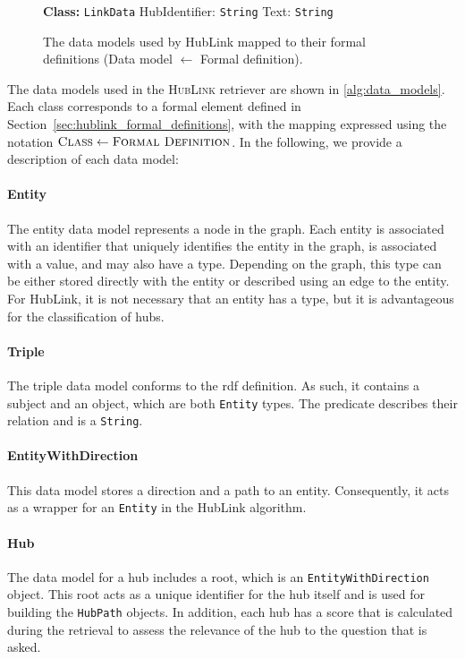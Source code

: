 \begin{figure}
\begin{algorithmic}[1]
\Statex
\Statex \textbf{Class:} \texttt{LinkData}
    \Statex \quad HubIdentifier: \texttt{String} 
    \Statex \quad Text: \texttt{String} 

\end{algorithmic}
\caption[Data Models with Formal Definitions]{The data models used by HubLink mapped to their formal definitions (Data model $\leftarrow$ Formal definition).}
\label{alg:data_models}
\end{figure}


The data models used in the \textsc{HubLink} retriever are shown in \autoref{alg:data_models}. Each class corresponds to a formal element defined in Section~\ref{sec:hublink_formal_definitions}, with the mapping expressed using the notation \(\textsc{Class} \leftarrow \textsc{Formal Definition}\). In the following, we provide a description of each data model:

\paragraph{Entity} The entity data model represents a node in the graph. Each entity is associated with an identifier that uniquely identifies the entity in the graph, is associated with a value, and may also have a type. Depending on the graph, this type can be either stored directly with the entity or described using an edge to the entity. For HubLink, it is not necessary that an entity has a type, but it is advantageous for the classification of hubs.

\paragraph{Triple} The triple data model conforms to the \gls{rdf} definition. As such, it contains a subject and an object, which are both \texttt{Entity} types. The predicate describes their relation and is a \texttt{String}.

\paragraph{EntityWithDirection} This data model stores a direction and a path to an entity. Consequently, it acts as a wrapper for an \texttt{Entity} in the HubLink algorithm. 

\paragraph{Hub} The data model for a hub includes a root, which is an \texttt{EntityWithDirection} object. This root acts as a unique identifier for the hub itself and is used for building the \texttt{HubPath} objects. In addition, each hub has a score that is calculated during the retrieval to assess the relevance of the hub to the question that is asked.

